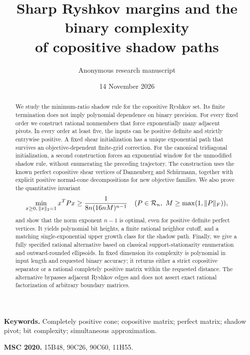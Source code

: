 \documentclass[11pt]{article}
\title{Sharp Ryshkov margins and the binary complexity\texorpdfstring{\\}{ }of copositive shadow paths}
\author{Anonymous research manuscript}
\date{14 November 2026}
\theoremstyle{definition}\newtheorem{definition}[theorem]{Definition}
\newcommand{\Ry}{\mathcal R}\newcommand{\Sym}{\mathbb S}
\numberwithin{equation}{section}
\begin{document}
\maketitle
\begin{abstract}
We study the minimum-ratio shadow rule for the copositive Ryshkov set. Its finite termination does not imply polynomial dependence on binary precision. For every fixed order we construct rational nonmembers that force exponentially many adjacent pivots. In every order at least five, the inputs can be positive definite and strictly entrywise positive. A fixed shear initialization has a unique exponential path that survives an objective-dependent finite-grid correction. For the canonical tridiagonal initialization, a second construction forces an exponential window for the unmodified shadow rule, without enumerating the preceding trajectory. The construction uses the known perfect copositive shear vertices of Dannenberg and Sch\"urmann, together with explicit positive normal-cone decompositions for new objective families. We also prove the quantitative invariant
\[
\min_{x\ge0,\,\norm{x}_2=1}x^TPx\ge\frac1{8n(16nM)^{n-1}}
\quad(P\in\Ry_n,\ M\ge\max(1,\norm{P}_F)),
\]
and show that the norm exponent $n-1$ is optimal, even for positive definite perfect vertices. It yields polynomial bit heights, a finite rational neighbor cutoff, and a matching single-exponential upper growth class for the shadow path. Finally, we give a fully specified rational alternative based on classical support-stationarity enumeration and outward-rounded ellipsoids. In fixed dimension its complexity is polynomial in input length and requested binary accuracy; it returns either a strict copositive separator or a rational completely positive matrix within the requested distance. The alternative bypasses adjacent Ryshkov edges and does not assert exact rational factorization of arbitrary boundary matrices.
\end{abstract}
\noindent\textbf{Keywords.} Completely positive cone; copositive matrix; perfect matrix; shadow pivot; bit complexity; simultaneous approximation.\par
\noindent\textbf{MSC 2020.} 15B48, 90C26, 90C60, 11H55.













\end{document}
